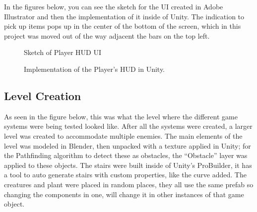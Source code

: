 \documentclass[11pt]{report}
\begin{document}
In the figures below, you can see the sketch for the UI created in Adobe Illustrator and then the implementation of it inside of Unity. The indication to pick up items pops up in the center of the bottom of the screen, which in this project was moved out of the way adjacent the bars on the top left.
\begin{figure}[H]
    \centering
    \caption{Sketch of Player HUD UI}
\end{figure}
\begin{figure}[H]
    \centering
    \caption{Implementation of the Player's HUD in Unity.}
\end{figure}


\subsection{Level Creation}
As seen in the figure below, this was what the level where the different game systems were being tested looked like. After all the systems were created, a larger level was created to accommodate multiple enemies.
The main elements of the level was modeled in Blender, then unpacked with a texture applied in Unity; for the Pathfinding algorithm to detect these as obstacles, the “Obstacle” layer was applied to these objects. The stairs were built inside of Unity's ProBuilder, it has a tool to auto generate stairs with custom properties, like the curve added.
The creatures and plant were placed in random places, they all use the same prefab so changing the components in one, will change it in other instances of that game object.
\end{document}
